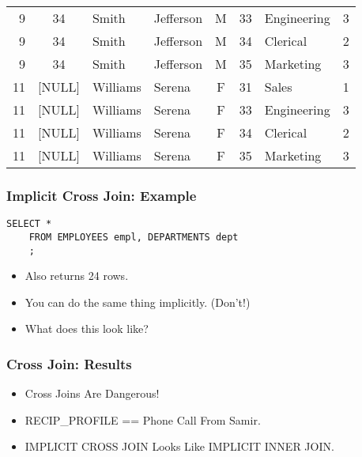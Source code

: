 \documentclass{beamer}
\begin{document}
\begin{frame}
\begin{center}
{\begin{tabulary}{\textwidth}{RCLLCRLC}
        9   & 34       & Smith      & Jefferson   & M      & 33       & Engineering & 3           \\
        9   & 34       & Smith      & Jefferson   & M      & 34       & Clerical    & 2           \\
        9   & 34       & Smith      & Jefferson   & M      & 35       & Marketing   & 3           \\
        11  & [NULL]   & Williams   & Serena      & F      & 31       & Sales       & 1           \\
        11  & [NULL]   & Williams   & Serena      & F      & 33       & Engineering & 3           \\
        11  & [NULL]   & Williams   & Serena      & F      & 34       & Clerical    & 2           \\
        11  & [NULL]   & Williams   & Serena      & F      & 35       & Marketing   & 3           \\
      \end{tabulary}
    }
  \end{center}

\end{frame}

\begin{frame}[containsverbatim]
  \frametitle{Implicit Cross Join: Example}
 
  \begin{lstlisting}[title={\tiny Source: https://github.com/Choens/sql-survival-guide/blob/master/sql/04-joins/cross-joins.sql}]
    SELECT *
    FROM EMPLOYEES empl, DEPARTMENTS dept
    ;
  \end{lstlisting}
  \bigskip
  \begin{itemize}
  \item Also returns 24 rows.
  \item You can do the same thing implicitly. (Don't!)
  \item What does this look like?
  \end{itemize}
  
\end{frame}

\begin{frame}
  \frametitle{Cross Join: Results}
  \begin{itemize}
  \item Cross Joins Are Dangerous!
  \item RECIP\_PROFILE == Phone Call From Samir.
  \item IMPLICIT CROSS JOIN Looks Like IMPLICIT INNER JOIN.
  \end{itemize}
\end{frame}
\end{document}
